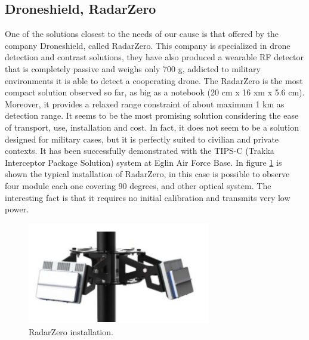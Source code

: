 \subsection{Droneshield, RadarZero}
One of the solutions closest to the needs of our cause is that offered by the company Droneshield, called RadarZero. This company is specialized in drone detection and contrast solutions, they have also produced a wearable RF detector that is completely passive and weighs only 700 g, addicted to military environments it is able to detect a cooperating drone. The RadarZero is the most compact solution observed so far, as big as a notebook (20 cm x 16 xm x 5.6 cm). Moreover, it provides a relaxed range constraint of about maximum 1 km as detection range. It seems to be the most promising solution considering the ease of transport, use, installation and cost. In fact, it does not seem to be a solution designed for military cases, but it is perfectly suited to civilian and private contexts. It has been successfully demonstrated with the TIPS-C (Trakka Interceptor Package Solution) system at Eglin Air Force Base. In figure \ref{radarzero} is shown the typical installation of RadarZero, in this case is possible to observe four module each one covering 90 degrees, and other optical system. The interesting fact is that it requires no initial calibration and transmits very low power.

\begin{figure}[h!]
    \centering
    \includegraphics[width=8cm]{imgs/RadarZero installation.png}
    \caption{RadarZero installation.}
    \label{radarzero}
\end{figure}

\newpage


